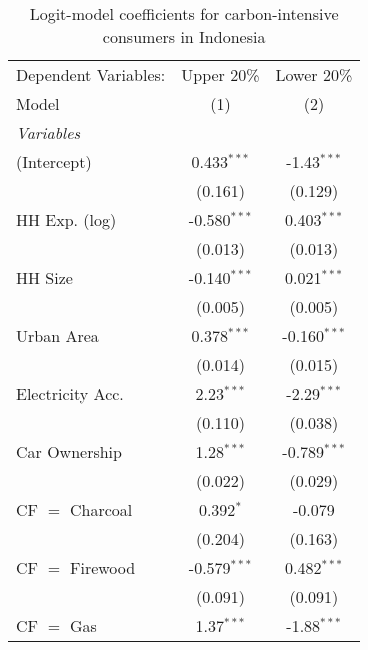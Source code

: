 
\begin{table}[htbp!]
   \centering
   \small
   \begin{adjustbox}{width = 1\textwidth, max height = 0.95\textheight, center}
      \begin{threeparttable}[b]
         \caption{\label{tab:Logit_1_IDN} Logit-model coefficients for carbon-intensive consumers in Indonesia}
         \begin{tabular}{lcc}
            \tabularnewline \midrule \midrule
            Dependent Variables: & Upper 20\%     & Lower 20\%\\   
            Model                & (1)            & (2)\\  
            \midrule
            \emph{Variables}\\
            (Intercept)          & 0.433$^{***}$  & -1.43$^{***}$\\   
                                 & (0.161)        & (0.129)\\   
            HH Exp. (log)        & -0.580$^{***}$ & 0.403$^{***}$\\   
                                 & (0.013)        & (0.013)\\   
            HH Size              & -0.140$^{***}$ & 0.021$^{***}$\\   
                                 & (0.005)        & (0.005)\\   
            Urban Area           & 0.378$^{***}$  & -0.160$^{***}$\\   
                                 & (0.014)        & (0.015)\\   
            Electricity Acc.     & 2.23$^{***}$   & -2.29$^{***}$\\   
                                 & (0.110)        & (0.038)\\   
            Car Ownership        & 1.28$^{***}$   & -0.789$^{***}$\\   
                                 & (0.022)        & (0.029)\\   
            CF $=$ Charcoal      & 0.392$^{*}$    & -0.079\\   
                                 & (0.204)        & (0.163)\\   
            CF $=$ Firewood      & -0.579$^{***}$ & 0.482$^{***}$\\   
                                 & (0.091)        & (0.091)\\   
            CF $=$ Gas           & 1.37$^{***}$   & -1.88$^{***}$\\   

\end{tabular}
\end{threeparttable}
\end{adjustbox}
\end{table}
